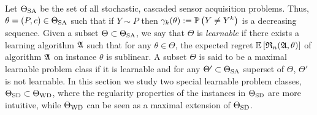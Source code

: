 Let $\Theta_{\mathrm{SA}}$ be the set of all stochastic, cascaded sensor acquisition problems.
Thus, $\theta = (P,c)\in \Theta_{\mathrm{SA}}$ such that if $Y\sim P$ then $\gamma_k(\theta):=\mathbb{P}\left(Y\ne Y^k\right)$ 
is a decreasing sequence.
Given a subset $\Theta\subset \Theta_{\mathrm{SA}}$, we say that $\Theta$ is \emph{learnable} 
if there exists a learning algorithm $\mathfrak{A}$ such that
for any $\theta\in \Theta$, the expected regret $\mathbb{E}\left[ \mathfrak{R}_n(\mathfrak{A},\theta) \right]$ 
of algorithm $\mathfrak{A}$ on instance $\theta$ is sublinear.
A subset $\Theta$ is said to be a maximal learnable problem class if it is learnable and for any $\Theta'\subset \Theta_{\mathrm{SA}}$ superset
of $\Theta$, $\Theta'$ is not learnable.
In this section we study two special learnable problem classes, $\Theta_{\mathrm{SD}}\subset \Theta_{\mathrm{WD}}$, where the regularity properties of the instances in $\Theta_{\mathrm{SD}}$ are more intuitive, while $\Theta_{\mathrm{WD}}$ can be seen as a maximal extension of $\Theta_{\mathrm{SD}}$.

